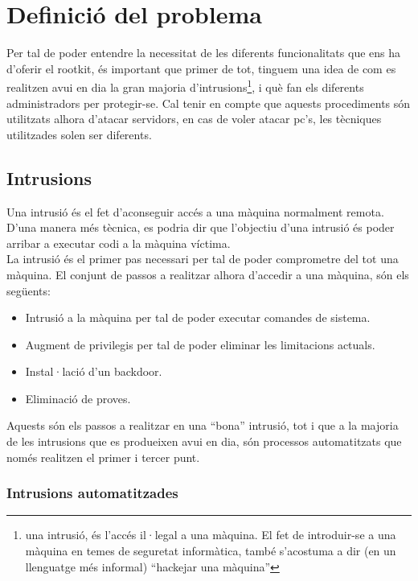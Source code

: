 \chapter{Definició del problema}

Per tal de poder entendre la necessitat de les diferents funcionalitats que ens ha d'oferir el rootkit,
és important que primer de tot, tinguem una idea de com es realitzen avui en dia la gran majoria
d'intrusions\footnote{una intrusió, és l'accés il·legal a una màquina. El fet de introduir-se a una màquina
en temes de seguretat informàtica, també s'acostuma a dir (en un llenguatge més informal) ``hackejar una màquina''},
i què fan els diferents administradors per protegir-se. Cal tenir en compte que aquests procediments són 
utilitzats alhora d'atacar servidors, en cas de voler atacar pc's, les tècniques utilitzades solen ser diferents.

\section{Intrusions}

Una intrusió és el fet d'aconseguir accés a una màquina normalment remota. D'una manera més tècnica, es podria dir
que l'objectiu d'una intrusió és poder arribar a executar codi a la màquina víctima. \\

La intrusió és el primer pas necessari per tal de poder comprometre del tot una màquina. El conjunt de passos a 
realitzar alhora d'accedir a una màquina, són els següents:

\begin{itemize}
\item Intrusió a la màquina per tal de poder executar comandes de sistema.
\item Augment de privilegis per tal de poder eliminar les limitacions actuals.
\item Instal·lació d'un backdoor.
\item Eliminació de proves.
\end{itemize}

Aquests són els passos a realitzar en una ``bona'' intrusió, tot i que a la majoria de les intrusions que es produeixen
avui en dia, són processos automatitzats que només realitzen el primer i tercer punt.

\subsection{Intrusions automatitzades} 

